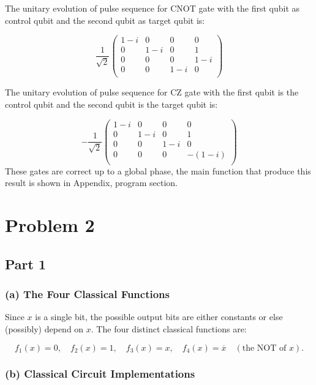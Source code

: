\documentclass[11pt]{article}
\begin{document}
The unitary evolution of pulse sequence for CNOT gate with the first qubit as control qubit and the second qubit as target qubit is:

\[
\frac{1}{\sqrt{2}}
\begin{pmatrix}
1-i & 0 & 0 & 0 \\
0 & 1-i & 0 & 1 \\
0 & 0 & 0 & 1-i \\
0 & 0 & 1-i & 0 \\
\end{pmatrix}
\]

The unitary evolution of pulse sequence for CZ gate with the first qubit is the control qubit and the second qubit is the target qubit is:

\[
-\frac{1}{\sqrt{2}}
\begin{pmatrix}
1-i & 0 & 0 & 0 \\
0 & 1-i & 0 & 1 \\
0 & 0 & 1-i & 0 \\
0 & 0 & 0 & -(1-i) \\
\end{pmatrix}
\]
These gates are correct up to a global phase, the main function that produce this result is shown in Appendix, program section.


\section*{Problem 2}
\subsection*{Part 1}
\subsubsection*{(a) The Four Classical Functions}

Since \(x\) is a single bit, the possible output bits are either constants or else (possibly) depend on \(x\). The four distinct classical functions are:

\[
  f_1(x) = 0, 
  \quad
  f_2(x) = 1, 
  \quad
  f_3(x) = x, 
  \quad
  f_4(x) = \overline{x} \quad (\text{the NOT of } x).
\]

\subsubsection*{(b) Classical Circuit Implementations}
\end{document}
